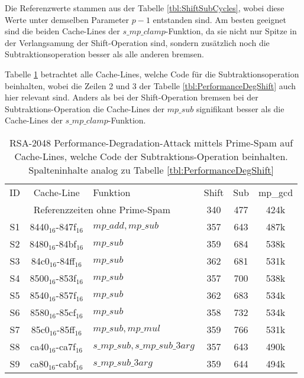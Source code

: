 Die Referenzwerte stammen aus der Tabelle \ref{tbl:ShiftSubCycles}, wobei diese Werte unter demselben Parameter $p-1$ entstanden sind.
Am besten geeignet sind die beiden Cache-Lines der $s\_mp\_clamp$-Funktion, da sie nicht nur Spitze in der Verlangsamung der Shift-Operation sind, sondern zusätzlich noch die Subtraktionsoperation besser als alle anderen bremsen.

Tabelle \ref{tbl:PerformanceDegSub} betrachtet alle Cache-Lines, welche Code für die Subtraktionsoperation beinhalten, wobei die Zeilen 2 und 3 der Tabelle \ref{tbl:PerformanceDegShift} auch hier relevant sind.
Anders als bei der Shift-Operation bremsen bei der Subtraktions-Operation die Cache-Lines der $mp\_sub$ signifikant besser als die Cache-Lines der $s\_mp\_clamp$-Funktion.

\begin{table}[h]
\caption{RSA-2048 Performance-Degradation-Attack mittels Prime-Spam auf Cache-Lines, welche Code der Subtraktions-Operation beinhalten.
Spalteninhalte analog zu Tabelle \ref{tbl:PerformanceDegShift}}
\label{tbl:PerformanceDegSub}
\begin{tabular}{cclccc}
ID &Cache-Line & Funktion                     & Shift & Sub & mp\_gcd \\[10pt]
\multicolumn{3}{c}{Referenzzeiten ohne Prime-Spam}        & 340   & 477         & 424k    \\
S1 & 8440$_{16}$-847f$_{16}$  & $mp\_add, mp\_sub$             & 357   & 643         & 487k    \\
S2 & 8480$_{16}$-84bf$_{16}$  & $mp\_sub$                      & 359   & 684         & 538k    \\
S3 & 84c0$_{16}$-84ff$_{16}$  & $mp\_sub$                      & 362   & 681         & 531k    \\
S4 & 8500$_{16}$-853f$_{16}$  & $mp\_sub$                      & 357   & 700         & 538k    \\
S5 & 8540$_{16}$-857f$_{16}$  & $mp\_sub$                      & 362   & 683         & 534k    \\
S6 & 8580$_{16}$-85cf$_{16}$  & $mp\_sub$                      & 358   & 732         & 534k    \\
S7 & 85c0$_{16}$-85ff$_{16}$  & $mp\_sub, mp\_mul$            & 359   & 766         & 531k    \\ \hline
S8 & ca40$_{16}$-ca7f$_{16}$  & $s\_mp\_sub, s\_mp\_sub\_3arg$ & 357   & 643         & 490k    \\
S9 & ca80$_{16}$-cabf$_{16}$  & $s\_mp\_sub\_3arg$             & 359   & 644         & 494k    \\

\end{tabular}
\end{table}
